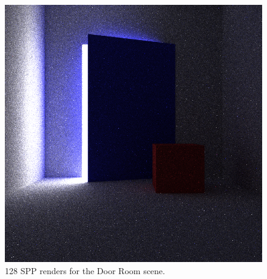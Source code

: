\documentclass[ %
                    author={Callum Pearce},
                supervisor={Dr. Neill Campbell},
                    degree={MEng},
                     title={Learning the incident radiance for a continuous state space rather than a discrete one is more beneficial for Importance Sampling in Monte Carlo Path Tracing},
                  subtitle={},
                      type={research},
                      year={2019} ]{dissertation}
\begin{document}
\begin{figure}[h]
\endminipage\hspace{1em}
  \includegraphics[width=\textwidth]{images/renders/door_room/nn.png}
\endminipage
\caption{128 SPP renders for the Door Room scene.}
\label{fig:door_room}
\end{figure}

\end{document}

